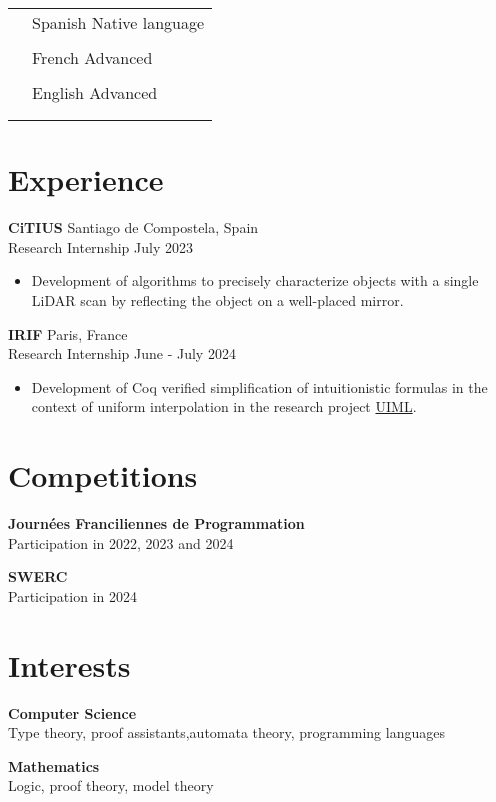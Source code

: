 \documentclass[12pt]{article}
\newcommand{\entry}[4]{{{\textbf{#1}}} \hfill #3 \\ #2 \hfill #4}
\newcommand{\tableentry}[3]{\textsc{#1} & #2\expandafter\ifstrequal\expandafter{#3}{}{\\}{\\[6pt]}}
\begin{document}
\begin{paracol}{2}
\begin{supertabular}{rl}
		\tableentry{\footnotesize\faLanguage}{Spanish \textperiodcentered{} Native language}{}
		\tableentry{}{French \textperiodcentered{} Advanced}{}
		\tableentry{}{English \textperiodcentered{} Advanced}{}
	\end{supertabular}

	\switchcolumn*

	\section{Experience}

	\entry{CiTIUS}{Research Internship}{Santiago de Compostela, Spain}{July 2023}
	\begin{itemize}[noitemsep,leftmargin=3.5mm,rightmargin=0mm,topsep=6pt]
		\item Development of algorithms to precisely characterize objects with a single LiDAR scan by reflecting the object on a well-placed mirror.
	\end{itemize}

	\entry{IRIF}{Research Internship}{Paris, France}{June - July 2024}
	\begin{itemize}[noitemsep,leftmargin=3.5mm,rightmargin=0mm,topsep=6pt]
		\item Development of Coq verified simplification of intuitionistic formulas in the context of uniform interpolation in the research project \href{https://github.com/hferee/UIML}{UIML}\cite{feree:hal-04859429}.
	\end{itemize}

	\switchcolumn

	\section{Competitions}

	\textbf{Journées Franciliennes de Programmation}\\
	\noindent Participation in 2022, 2023 and 2024

	\textbf{SWERC}\\
	\noindent Participation in 2024

\end{paracol}

\section{Interests}

\begin{paracol}{2}

	\entry{Computer Science}{Type theory, proof assistants,automata theory,  programming languages}{ }{ }

	\switchcolumn

	\entry{Mathematics}{Logic, proof theory, model theory}{ }{ }
\end{paracol}
\end{document}

